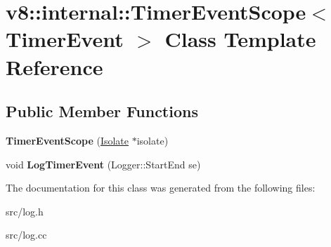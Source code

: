 \hypertarget{classv8_1_1internal_1_1_timer_event_scope}{}\section{v8\+:\+:internal\+:\+:Timer\+Event\+Scope$<$ Timer\+Event $>$ Class Template Reference}
\label{classv8_1_1internal_1_1_timer_event_scope}
\subsection*{Public Member Functions}
\begin{DoxyCompactItemize}
\item 
\hypertarget{classv8_1_1internal_1_1_timer_event_scope_abc9abae0ace69313684ee43d79e7920a}{}{\bfseries Timer\+Event\+Scope} (\hyperlink{classv8_1_1internal_1_1_isolate}{Isolate} $\ast$isolate)\label{classv8_1_1internal_1_1_timer_event_scope_abc9abae0ace69313684ee43d79e7920a}

\item 
\hypertarget{classv8_1_1internal_1_1_timer_event_scope_ab4c8e13bd0af2e8329c1d9c7e2d62189}{}void {\bfseries Log\+Timer\+Event} (Logger\+::\+Start\+End se)\label{classv8_1_1internal_1_1_timer_event_scope_ab4c8e13bd0af2e8329c1d9c7e2d62189}

\end{DoxyCompactItemize}


The documentation for this class was generated from the following files\+:\begin{DoxyCompactItemize}
\item 
src/log.\+h\item 
src/log.\+cc\end{DoxyCompactItemize}
